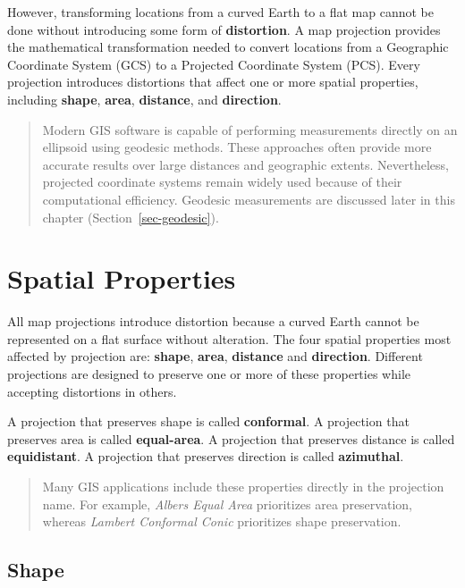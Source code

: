 \documentclass[
  letterpaper,
]{book}
\begin{document}
However, transforming locations from a curved Earth to a flat map cannot
be done without introducing some form of \textbf{distortion}. A map
projection provides the mathematical transformation needed to convert
locations from a Geographic Coordinate System (GCS) to a Projected
Coordinate System (PCS). Every projection introduces distortions that
affect one or more spatial properties, including \textbf{shape},
\textbf{area}, \textbf{distance}, and \textbf{direction}.

\begin{quote}
Modern GIS software is capable of performing measurements directly on an
ellipsoid using geodesic methods. These approaches often provide more
accurate results over large distances and geographic extents.
Nevertheless, projected coordinate systems remain widely used because of
their computational efficiency. Geodesic measurements are discussed
later in this chapter (Section~\ref{sec-geodesic}).
\end{quote}

\section{Spatial Properties}\label{spatial-properties}

All map projections introduce distortion because a curved Earth cannot
be represented on a flat surface without alteration. The four spatial
properties most affected by projection are: \textbf{shape},
\textbf{area}, \textbf{distance} and \textbf{direction}. Different
projections are designed to preserve one or more of these properties
while accepting distortions in others.

A projection that preserves shape is called \textbf{conformal}. A
projection that preserves area is called \textbf{equal-area}. A
projection that preserves distance is called \textbf{equidistant}. A
projection that preserves direction is called \textbf{azimuthal}.

\begin{quote}
Many GIS applications include these properties directly in the
projection name. For example, \emph{Albers Equal Area} prioritizes area
preservation, whereas \emph{Lambert Conformal Conic} prioritizes shape
preservation.
\end{quote}

\subsection{Shape}\label{shape}
\end{document}
